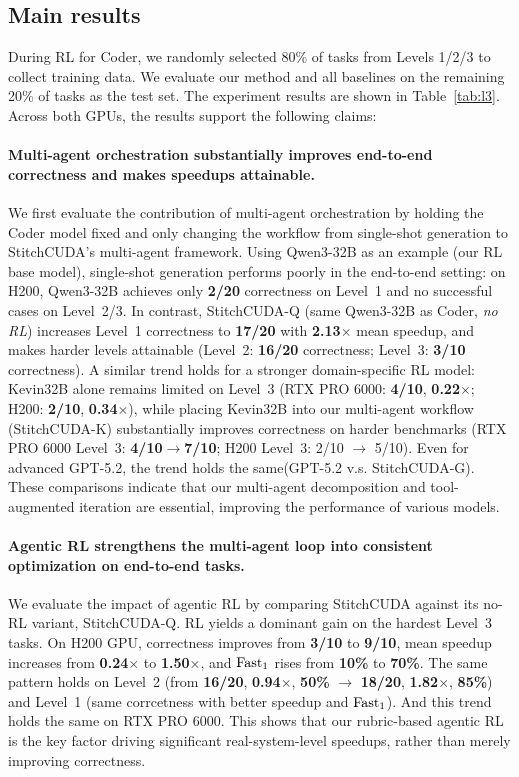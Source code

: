 \vspace{-15pt}
\subsection{Main results}
During RL for Coder, we randomly selected 80\% of tasks from Levels 1/2/3 to collect training data. We evaluate our method and all baselines on the remaining 20\% of tasks as the test set. The experiment results are shown in Table~\ref{tab:l3}. Across both GPUs, the results support the following claims: 
\paragraph{Multi-agent orchestration substantially improves end-to-end correctness and makes speedups attainable.}

We first evaluate the contribution of multi-agent orchestration by holding the Coder model fixed and only changing the workflow from single-shot generation to StitchCUDA’s multi-agent framework.
Using Qwen3-32B as an example (our RL base model), single-shot generation performs poorly in the end-to-end setting: on H200, Qwen3-32B achieves only \textbf{2/20} correctness on Level~1 and no successful cases on Level~2/3. In contrast, StitchCUDA-Q (same Qwen3-32B as Coder, \emph{no RL}) increases Level~1 correctness to \textbf{17/20} with \textbf{2.13$\times$} mean speedup, and makes harder levels attainable (Level~2: \textbf{16/20} correctness; Level~3: \textbf{3/10} correctness).
A similar trend holds for a stronger domain-specific RL model: Kevin32B alone remains limited on Level~3 (RTX PRO 6000: \textbf{4/10}, \textbf{0.22$\times$}; H200: \textbf{2/10}, \textbf{0.34$\times$}), while placing Kevin32B into our multi-agent workflow (StitchCUDA-K) substantially improves correctness on harder benchmarks (RTX PRO 6000 Level~3: \textbf{4/10}$\rightarrow$\textbf{7/10};  H200 Level~3: 2/10 $\rightarrow$ 5/10). Even for advanced GPT-5.2, the trend holds the same(GPT-5.2 v.s. StitchCUDA-G).
These comparisons indicate that our multi-agent decomposition and tool-augmented iteration are essential, improving the performance of various models.

\paragraph{Agentic RL strengthens the multi-agent loop into consistent optimization on end-to-end tasks.}
We evaluate the impact of agentic RL by comparing StitchCUDA against its no-RL variant, StitchCUDA-Q. RL yields a dominant gain on the hardest Level~3 tasks. On H200 GPU, correctness improves from \textbf{3/10} to \textbf{9/10}, mean speedup increases from \textbf{0.24$\times$} to \textbf{1.50$\times$}, and $\rm{Fast}_1$ rises from \textbf{10\%} to \textbf{70\%}. The same pattern holds on Level~2 (from \textbf{16/20}, \textbf{0.94$\times$}, \textbf{50\%} $\rightarrow$ \textbf{18/20}, \textbf{1.82$\times$}, \textbf{85\%}) and Level~1 (same corrcetness with better speedup and $\rm{Fast}_1$). And this trend holds the same on RTX PRO 6000. This shows that our rubric-based agentic RL is the key factor driving significant real-system-level speedups, rather than merely improving correctness.
